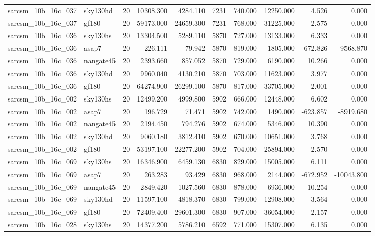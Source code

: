 \begin{tabular}{llrrrrrrrr}
sarcsm\_10b\_16c\_037 & sky130hd & 20 & 10308.300 & 4284.110 & 7231 & 740.000 & 12250.000 & 4.526 & 0.000 \\
sarcsm\_10b\_16c\_037 & gf180 & 20 & 59173.000 & 24659.300 & 7231 & 768.000 & 31225.000 & 2.575 & 0.000 \\
sarcsm\_10b\_16c\_036 & sky130hs & 20 & 13304.500 & 5289.110 & 5870 & 727.000 & 13133.000 & 6.333 & 0.000 \\
sarcsm\_10b\_16c\_036 & asap7 & 20 & 226.111 & 79.942 & 5870 & 819.000 & 1805.000 & -672.826 & -9568.870 \\
sarcsm\_10b\_16c\_036 & nangate45 & 20 & 2393.660 & 857.052 & 5870 & 729.000 & 6190.000 & 10.266 & 0.000 \\
sarcsm\_10b\_16c\_036 & sky130hd & 20 & 9960.040 & 4130.210 & 5870 & 703.000 & 11623.000 & 3.977 & 0.000 \\
sarcsm\_10b\_16c\_036 & gf180 & 20 & 64274.900 & 26299.100 & 5870 & 817.000 & 33705.000 & 2.001 & 0.000 \\
sarcsm\_10b\_16c\_002 & sky130hs & 20 & 12499.200 & 4999.800 & 5902 & 666.000 & 12448.000 & 6.602 & 0.000 \\
sarcsm\_10b\_16c\_002 & asap7 & 20 & 196.729 & 71.471 & 5902 & 742.000 & 1490.000 & -623.857 & -8919.680 \\
sarcsm\_10b\_16c\_002 & nangate45 & 20 & 2194.450 & 794.276 & 5902 & 674.000 & 5346.000 & 10.390 & 0.000 \\
sarcsm\_10b\_16c\_002 & sky130hd & 20 & 9060.180 & 3812.410 & 5902 & 670.000 & 10651.000 & 3.768 & 0.000 \\
sarcsm\_10b\_16c\_002 & gf180 & 20 & 53197.100 & 22277.200 & 5902 & 704.000 & 25894.000 & 2.570 & 0.000 \\
sarcsm\_10b\_16c\_069 & sky130hs & 20 & 16346.900 & 6459.130 & 6830 & 829.000 & 15005.000 & 6.111 & 0.000 \\
sarcsm\_10b\_16c\_069 & asap7 & 20 & 263.283 & 93.429 & 6830 & 968.000 & 2144.000 & -672.952 & -10043.800 \\
sarcsm\_10b\_16c\_069 & nangate45 & 20 & 2849.420 & 1027.560 & 6830 & 878.000 & 6936.000 & 10.254 & 0.000 \\
sarcsm\_10b\_16c\_069 & sky130hd & 20 & 11597.100 & 4818.370 & 6830 & 799.000 & 12908.000 & 3.564 & 0.000 \\
sarcsm\_10b\_16c\_069 & gf180 & 20 & 72409.400 & 29601.300 & 6830 & 907.000 & 36054.000 & 2.157 & 0.000 \\
sarcsm\_10b\_16c\_028 & sky130hs & 20 & 14377.200 & 5786.210 & 6592 & 771.000 & 15307.000 & 6.135 & 0.000 \\

\end{tabular}
